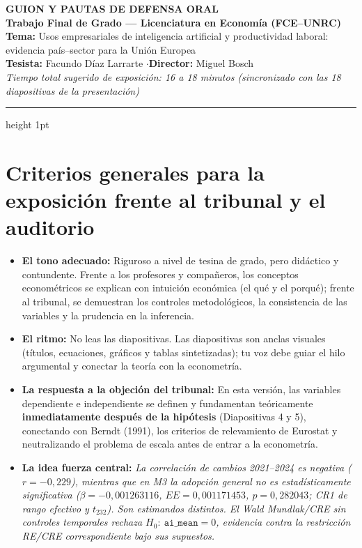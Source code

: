 \documentclass[11pt,a4paper]{article}
\begin{document}
\begin{center}
  {\Large\bfseries\color{ForestDark} GUION Y PAUTAS DE DEFENSA ORAL}\\[0.2cm]
  {\large\bfseries\color{Gold} Trabajo Final de Grado --- Licenciatura en Economía (FCE--UNRC)}\\[0.3cm]
  \textbf{Tema:} Usos empresariales de inteligencia artificial y productividad laboral: evidencia país--sector para la Unión Europea\\[0.1cm]
  \textbf{Tesista:} Facundo Díaz Larrarte \quad$\cdot$\quad \textbf{Director:} Miguel Bosch\\[0.15cm]
  \textit{Tiempo total sugerido de exposición: 16 a 18 minutos (sincronizado con las 18 diapositivas de la presentación)}
\end{center}

\vspace{0.4cm}
\hrule height 1pt
\vspace{0.6cm}

\section*{Criterios generales para la exposición frente al tribunal y el auditorio}

\begin{itemize}[leftmargin=1.5em,itemsep=0.3em]
  \item \textbf{El tono adecuado:} Riguroso a nivel de tesina de grado, pero didáctico y contundente. Frente a los profesores y compañeros, los conceptos econométricos se explican con intuición económica (el qué y el porqué); frente al tribunal, se demuestran los controles metodológicos, la consistencia de las variables y la prudencia en la inferencia.
  \item \textbf{El ritmo:} No leas las diapositivas. Las diapositivas son anclas visuales (títulos, ecuaciones, gráficos y tablas sintetizadas); tu voz debe guiar el hilo argumental y conectar la teoría con la econometría.
  \item \textbf{La respuesta a la objeción del tribunal:} En esta versión, las variables dependiente e independiente se definen y fundamentan teóricamente \textbf{inmediatamente después de la hipótesis} (Diapositivas 4 y 5), conectando con Berndt (1991), los criterios de relevamiento de Eurostat y neutralizando el problema de escala antes de entrar a la econometría.
  \item \textbf{La idea fuerza central:} \textit{La correlación de cambios 2021--2024 es negativa ($r=-0{,}229$), mientras que en M3 la adopción general no es estadísticamente significativa ($\beta=-0{,}001263116$, $EE=0{,}001171453$, $p=0{,}282043$; CR1 de rango efectivo y $t_{232}$). Son estimandos distintos. El Wald Mundlak/CRE sin controles temporales rechaza $H_0:\ \texttt{ai\_mean}=0$, evidencia contra la restricción RE/CRE correspondiente bajo sus supuestos.} 
\end{itemize}
\end{document}
